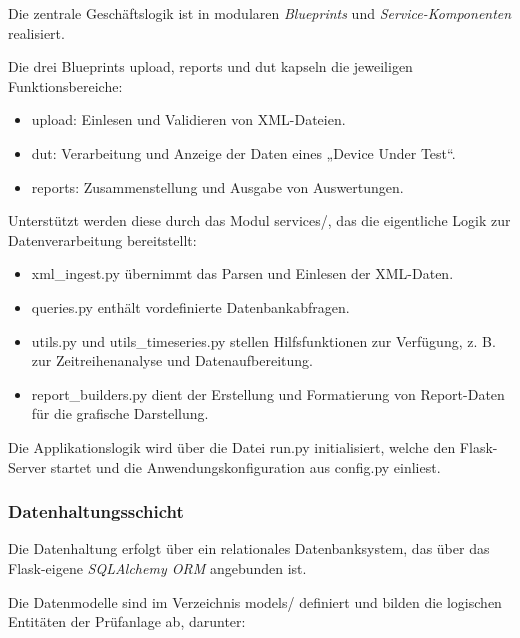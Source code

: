 Die zentrale Geschäftslogik ist in modularen \textit{Blueprints} und \textit{Service-Komponenten} realisiert.

Die drei Blueprints upload, reports und dut kapseln die jeweiligen Funktionsbereiche:

\begin{itemize}

\item
upload: Einlesen und Validieren von XML-Dateien.

\item
dut: Verarbeitung und Anzeige der Daten eines „Device Under Test“.

\item
reports: Zusammenstellung und Ausgabe von Auswertungen.

\end{itemize}

Unterstützt werden diese durch das Modul services/, das die eigentliche Logik zur Datenverarbeitung bereitstellt:

\begin{itemize}

\item
xml\_ingest.py übernimmt das Parsen und Einlesen der XML-Daten.

\item
queries.py enthält vordefinierte Datenbankabfragen.

\item
utils.py und utils\_timeseries.py stellen Hilfsfunktionen zur Verfügung, z. B. zur Zeitreihenanalyse und Datenaufbereitung.

\item
report\_builders.py dient der Erstellung und Formatierung von Report-Daten für die grafische Darstellung.

\end{itemize}

Die Applikationslogik wird über die Datei run.py initialisiert, welche den Flask-Server startet und die Anwendungskonfiguration aus config.py einliest.


\subsubsection*{Datenhaltungsschicht}

Die Datenhaltung erfolgt über ein relationales Datenbanksystem, das über das Flask-eigene \textit{SQLAlchemy ORM} angebunden ist.

Die Datenmodelle sind im Verzeichnis models/ definiert und bilden die logischen Entitäten der Prüfanlage ab, darunter:

